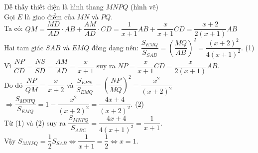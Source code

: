\begin{ex}
{\begin{center}
	\end{center}
			Dễ thấy thiết diện là hình thang $MNPQ$ (hình vẽ)\\
			Gọi $E$ là giao điểm của $MN$ và $PQ$.\\
			Ta có: $QM=\dfrac{MD}{AD} \cdot AB+\dfrac{AM}{AD} \cdot CD=\dfrac{1}{x+1}AB+\dfrac{x}{x+1}CD=\dfrac{x+2}{2(x+1)}AB$\\
			Hai tam giác $SAB$ và $EMQ$ đồng dạng nên: $\dfrac{S_{EMQ}}{S_{SAB}}=\left(\dfrac{MQ}{AB} \right)^2=\dfrac{(x+2)^2}{4(x+1)^2}$. (1)\\
			Vì $\dfrac{NP}{CD}=\dfrac{NS}{SD}=\dfrac{AM}{AD}=\dfrac{x}{x+1}$ suy ra $NP=\dfrac{x}{x+1}CD=\dfrac{x}{2(x+1)}AB$.\\
			Do đó $\dfrac{NP}{QM}=\dfrac{x}{x+2}$ và $\dfrac{S_{EPN}}{S_{EMQ}}=\left(\dfrac{NP}{MQ} \right)^2=\dfrac{x^2}{(x+2)^2}$\\
			$\Rightarrow \dfrac{S_{MNPQ}}{S_{EMQ}}=1-\dfrac{x^2}{(x+2)^2} =\dfrac{4x+4}{(x+2)^2}$. (2)\\
			Từ (1) và (2) suy ra $\dfrac{S_{MNPQ}}{S_{ABC}}=\dfrac{4x+4}{4(x+1)^2}=\dfrac{1}{x+1}$.\\
			Vậy $S_{MNPQ}=\dfrac{1}{2}S_{SAB} \Leftrightarrow \dfrac{1}{x+1}=\dfrac{1}{2} \Leftrightarrow x=1$.
	}
\end{ex}

